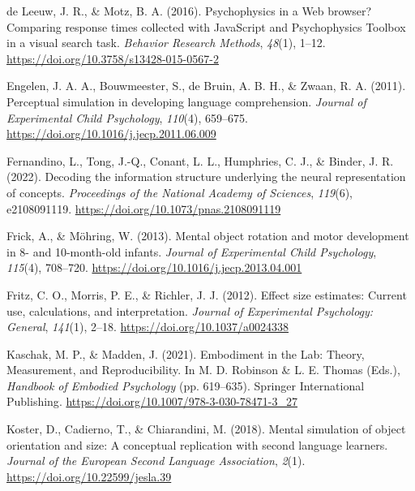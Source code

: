 \documentclass[
  man,floatsintext]{apa7}
\newlength{\cslhangindent}
\newlength{\cslentryspacingunit} %
\newenvironment{CSLReferences}[2] %
 {%
  \setlength{\parindent}{0pt}
  \ifodd #1
  \let\oldpar\par
  \def\par{\hangindent=\cslhangindent\oldpar}
  \fi
  \setlength{\parskip}{#2\cslentryspacingunit}
 }%
 {}
\begin{document}
\begin{CSLReferences}{1}{0}
\leavevmode{}%
de Leeuw, J. R., \& Motz, B. A. (2016). Psychophysics in a {Web} browser? {Comparing} response times collected with {JavaScript} and {Psychophysics Toolbox} in a visual search task. \emph{Behavior Research Methods}, \emph{48}(1), 1--12. \url{https://doi.org/10.3758/s13428-015-0567-2}

\leavevmode{}%
Engelen, J. A. A., Bouwmeester, S., de Bruin, A. B. H., \& Zwaan, R. A. (2011). Perceptual simulation in developing language comprehension. \emph{Journal of Experimental Child Psychology}, \emph{110}(4), 659--675. \url{https://doi.org/10.1016/j.jecp.2011.06.009}

\leavevmode{}%
Fernandino, L., Tong, J.-Q., Conant, L. L., Humphries, C. J., \& Binder, J. R. (2022). Decoding the information structure underlying the neural representation of concepts. \emph{Proceedings of the National Academy of Sciences}, \emph{119}(6), e2108091119. \url{https://doi.org/10.1073/pnas.2108091119}

\leavevmode{}%
Frick, A., \& Möhring, W. (2013). Mental object rotation and motor development in 8- and 10-month-old infants. \emph{Journal of Experimental Child Psychology}, \emph{115}(4), 708--720. \url{https://doi.org/10.1016/j.jecp.2013.04.001}

\leavevmode{}%
Fritz, C. O., Morris, P. E., \& Richler, J. J. (2012). Effect size estimates: Current use, calculations, and interpretation. \emph{Journal of Experimental Psychology: General}, \emph{141}(1), 2--18. \url{https://doi.org/10.1037/a0024338}

\leavevmode{}%
Kaschak, M. P., \& Madden, J. (2021). Embodiment in the {Lab}: {Theory}, {Measurement}, and {Reproducibility}. In M. D. Robinson \& L. E. Thomas (Eds.), \emph{Handbook of {Embodied Psychology}} (pp. 619--635). {Springer International Publishing}. \url{https://doi.org/10.1007/978-3-030-78471-3_27}

\leavevmode{}%
Koster, D., Cadierno, T., \& Chiarandini, M. (2018). Mental simulation of object orientation and size: {A} conceptual replication with second language learners. \emph{Journal of the European Second Language Association}, \emph{2}(1). \url{https://doi.org/10.22599/jesla.39}


\end{CSLReferences}
\end{document}
